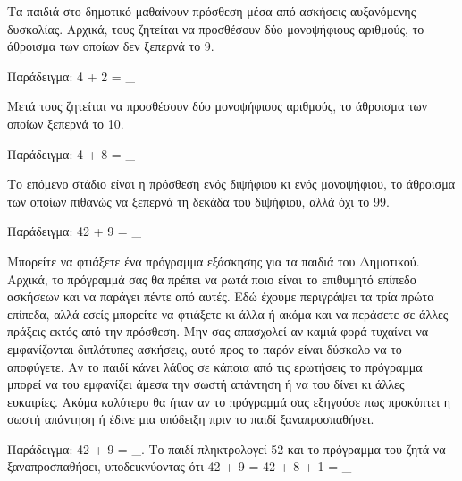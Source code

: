 \documentclass[a4paper,11pt,oneside]{book}
\begin{document}
\begin{exercise}
Τα παιδιά στο δημοτικό μαθαίνουν πρόσθεση μέσα από ασκήσεις αυξανόμενης δυσκολίας. Αρχικά, τους ζητείται να προσθέσουν δύο μονοψήφιους αριθμούς, το άθροισμα των οποίων δεν ξεπερνά το 9. 

\begin{note}
Παράδειγμα: 4 + 2 = \_
\end{note}



Μετά τους ζητείται να προσθέσουν δύο μονοψήφιους αριθμούς, το άθροισμα των οποίων ξεπερνά το 10. 

\begin{note}
Παράδειγμα: 4 + 8 = \_
\end{note}

Το επόμενο στάδιο είναι η πρόσθεση ενός διψήφιου κι ενός μονοψήφιου, το άθροισμα των οποίων πιθανώς να ξεπερνά τη δεκάδα του διψήφιου, αλλά όχι το 99.

\begin{note}
Παράδειγμα: 42 + 9 = \_
\end{note}

Μπορείτε να φτιάξετε ένα πρόγραμμα εξάσκησης για τα παιδιά του Δημοτικού. Αρχικά, το πρόγραμμά σας θα πρέπει να ρωτά ποιο είναι το επιθυμητό επίπεδο ασκήσεων και να παράγει πέντε από αυτές. Εδώ έχουμε περιγράψει τα τρία πρώτα επίπεδα, αλλά εσείς μπορείτε να φτιάξετε κι άλλα ή ακόμα και να περάσετε σε άλλες πράξεις εκτός από την πρόσθεση. Μην σας απασχολεί αν καμιά φορά τυχαίνει να εμφανίζονται διπλότυπες ασκήσεις, αυτό προς το παρόν είναι δύσκολο να το αποφύγετε. Αν το παιδί κάνει λάθος σε κάποια από τις ερωτήσεις το πρόγραμμα μπορεί να του εμφανίζει άμεσα την σωστή απάντηση ή να του δίνει κι άλλες ευκαιρίες. Ακόμα καλύτερο θα ήταν αν το πρόγραμμά σας εξηγούσε πως προκύπτει η σωστή απάντηση ή έδινε μια υπόδειξη πριν το παιδί ξαναπροσπαθήσει.

\begin{note}
Παράδειγμα: 42 + 9 = \_. Το παιδί πληκτρολογεί 52 και το πρόγραμμα του ζητά να ξαναπροσπαθήσει, υποδεικνύοντας ότι 42 + 9 = 42 + 8 + 1 = \_
\end{note}
\end{exercise}


\section*{}
\vspace{4\parskip}
\hrulefill
\end{document}
